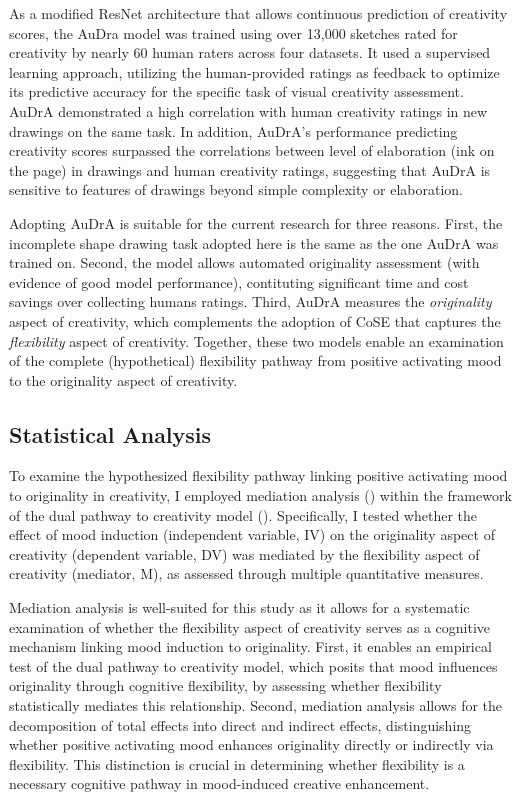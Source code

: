\documentclass[../MA_Thesis.tex]{subfiles}
\begin{document}
As a modified ResNet architecture that allows continuous prediction of creativity scores, the AuDra model was trained using over 13,000 sketches rated for creativity by nearly 60 human raters across four datasets. It used a supervised learning approach, utilizing the human-provided ratings as feedback to optimize its predictive accuracy for the specific task of visual creativity assessment. AuDrA demonstrated a high correlation with human creativity ratings in new drawings on the same task. In addition, AuDrA's performance predicting creativity scores surpassed the correlations between level of elaboration (ink on the page) in drawings and human creativity ratings, suggesting that AuDrA is sensitive to features of drawings beyond simple complexity or elaboration. 

Adopting AuDrA is suitable for the current research for three reasons. First, the incomplete shape drawing task adopted here is the same as the one AuDrA was trained on. Second, the model allows automated originality assessment (with evidence of good model performance), contituting significant time and cost savings over collecting humans ratings. Third, AuDrA measures the \textit{originality} aspect of creativity, which complements the adoption of CoSE that captures the \textit{flexibility} aspect of creativity. Together, these two models enable an examination of the complete (hypothetical) flexibility pathway from positive activating mood to the originality aspect of creativity.

\subsection*{Statistical Analysis}

To examine the hypothesized flexibility pathway linking positive activating mood to originality in creativity, I employed mediation analysis (\cite{mackinnon_mediation_2007}) within the framework of the dual pathway to creativity model (\cite{de_dreu_hedonic_2008}). Specifically, I tested whether the effect of mood induction (independent variable, IV) on the originality aspect of creativity (dependent variable, DV) 
was mediated by the flexibility aspect of creativity (mediator, M), as assessed through multiple quantitative measures.

Mediation analysis is well-suited for this study as it allows for a systematic examination of whether the flexibility aspect of creativity serves as a cognitive mechanism linking mood induction to originality. First, it enables an empirical test of the dual pathway to creativity model, which posits that mood influences originality through cognitive flexibility, by assessing whether flexibility statistically mediates this relationship. Second, mediation analysis allows for the decomposition of total effects into direct and indirect effects, distinguishing whether positive activating mood enhances originality directly or indirectly via flexibility. This distinction is crucial in determining whether flexibility is a necessary cognitive pathway in mood-induced creative enhancement.
\end{document}
